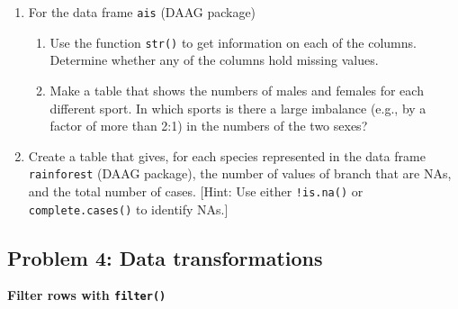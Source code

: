\documentclass[11pt,a4paper]{article}
\begin{document}
\begin{enumerate}
	 \item For the data frame \texttt{ais} (DAAG package)
	 \begin{enumerate}
	 	\item Use the function \texttt{str()} to get information on each of the columns. Determine whether any of the columns hold missing values.
	 	\item Make a table that shows the numbers of males and females for each different sport. In which sports is there a large imbalance (e.g., by a factor of more than 2:1) in the numbers of the two sexes?
	 \end{enumerate}
	 
	 \item Create a table that gives, for each species represented in the data frame \texttt{rainforest} (DAAG package), the number of values of branch that are NAs, and the total number of cases.
	 [Hint: Use either \texttt{!is.na()} or \texttt{complete.cases()} to identify NAs.]
	 
\end{enumerate}



\subsection*{Problem 4: Data transformations}
\textbf{Filter rows with \texttt{filter()}}
\end{document}

